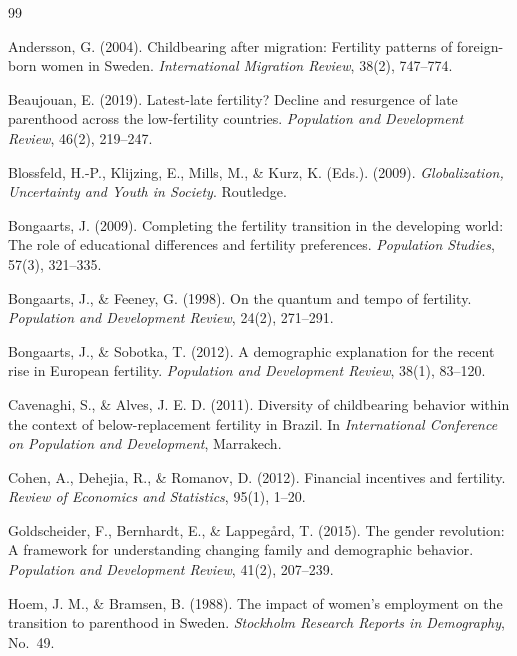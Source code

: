 \documentclass[12pt]{article}
\begin{document}
\begin{thebibliography}{99}

Andersson, G. (2004). Childbearing after migration: Fertility patterns of
foreign-born women in Sweden. \textit{International Migration Review},
38(2), 747--774.

Beaujouan, E. (2019). Latest-late fertility? Decline and resurgence of late
parenthood across the low-fertility countries. \textit{Population and
Development Review}, 46(2), 219--247.

Blossfeld, H.-P., Klijzing, E., Mills, M., \& Kurz, K. (Eds.). (2009).
\textit{Globalization, Uncertainty and Youth in Society}. Routledge.

Bongaarts, J. (2009). Completing the fertility transition in the developing
world: The role of educational differences and fertility preferences.
\textit{Population Studies}, 57(3), 321--335.

Bongaarts, J., \& Feeney, G. (1998). On the quantum and tempo of fertility.
\textit{Population and Development Review}, 24(2), 271--291.

Bongaarts, J., \& Sobotka, T. (2012). A demographic explanation for the
recent rise in European fertility. \textit{Population and Development Review},
38(1), 83--120.

Cavenaghi, S., \& Alves, J. E. D. (2011). Diversity of childbearing behavior
within the context of below-replacement fertility in Brazil. In
\textit{International Conference on Population and Development}, Marrakech.

Cohen, A., Dehejia, R., \& Romanov, D. (2012). Financial incentives and
fertility. \textit{Review of Economics and Statistics}, 95(1), 1--20.

Goldscheider, F., Bernhardt, E., \& Lappeg\aa{}rd, T. (2015). The gender
revolution: A framework for understanding changing family and demographic
behavior. \textit{Population and Development Review}, 41(2), 207--239.

Hoem, J. M., \& Bramsen, B. (1988). The impact of women's employment on the
transition to parenthood in Sweden. \textit{Stockholm Research Reports in
Demography}, No.\ 49.


\end{thebibliography}
\end{document}
